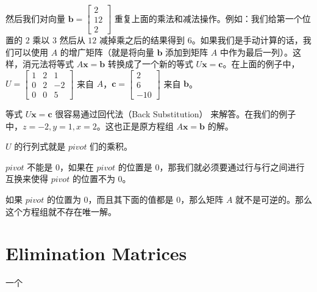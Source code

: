 \documentclass[green, cn, normal]{elegantnote}
\begin{document}
	然后我们对向量 $\textbf{b}=\begin{bmatrix}
	2 \\ 12 \\ 2
	\end{bmatrix}$ 重复上面的乘法和减法操作。例如：我们给第一个位置的 $2$ 乘以 $3$ 然后从 $12$ 减掉乘之后的结果得到 $6$。如果我们是手动计算的话，我们可以使用 $A$ 的增广矩阵（就是将向量 $\textbf{b}$ 添加到矩阵 $A$ 中作为最后一列）。这样，消元法将等式 $A\textbf{x} = \textbf{b}$ 转换成了一个新的等式 $U\textbf{x} = \textbf{c}$。在上面的例子中，$U=\begin{bmatrix}
	1 & 2 & 1 \\
	0 & 2 & -2 \\
	0 & 0 & 5
	\end{bmatrix}$ 来自 $A$，$\textbf{c}=\begin{bmatrix}
	2 \\ 6 \\-10
	\end{bmatrix}$ 来自 $\textbf{b}$。
	
	等式 $U\textbf{x} = \textbf{c}$ 很容易通过回代法（Back Substitution） 来解答。在我们的例子中，$z = -2, y=1, x = 2$。这也正是原方程组 $A\textbf{x} = \textbf{b}$ 的解。
	
	$U$ 的行列式就是 $pivot$ 们的乘积。
	
	$pivot$ 不能是 $0$，如果在 $pivot$ 的位置是 $0$，那我们就必须要通过行与行之间进行互换来使得 $pivot$ 的位置不为 $0$。
	
	如果 $pivot$ 的位置为 $0$，而且其下面的值都是 $0$，那么矩阵 $A$ 就不是可逆的。那么这个方程组就不存在唯一解。
	
	\section{Elimination Matrices}
	
	一个
	
\end{document}
